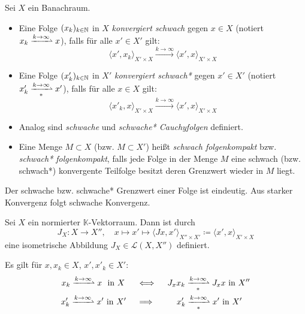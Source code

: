 \documentclass{cheat-sheet}
\newcommand{\K}{\mathbb{K}}
\newcommand{\LSO}{\mathcal{L}} %
\newcommand{\convWith}[1]{\xrightarrow{#1 \to \infty}} %
\newcommand{\convWeaklyWith}[1]{\xrightharpoonup{#1 \to \infty}} %
\newcommand{\convWeaklyStarWith}[1]{\xrightharpoonup[*]{#1 \to \infty}} %
\begin{document}
\begin{defn}
  Sei $X$ ein Banachraum.
  \begin{itemize}
    \item Eine Folge $(x_k)_{k \in \mathbb{N}}$ in $X$ \emph{konvergiert schwach} gegen $x \in X$ (notiert $x_k \convWeaklyWith{k} x$), falls für alle $x' \in X'$ gilt:
    \[ \langle x', x_k \rangle_{X' {\times} X} \convWith{k} \langle x', x \rangle_{X' {\times} X} \]
    \item Eine Folge $(x'_k)_{k \in \mathbb{N}}$ in $X'$ \emph{konvergiert schwach*} gegen $x' \in X'$ (notiert $x'_k \convWeaklyStarWith{k} x'$), falls für alle $x \in X$ gilt:
    \[ \langle x'_k, x \rangle_{X' {\times} X} \convWith{k} \langle x', x \rangle_{X' {\times} X} \]
    \item Analog sind \emph{schwache} und \emph{schwache* Cauchyfolgen} definiert.
    \item Eine Menge $M \subset X$ (bzw. $M \subset X'$) heißt \emph{schwach folgenkompakt} bzw. \emph{schwach* folgenkompakt}, falls jede Folge in der Menge $M$ eine schwach (bzw. schwach*) konvergente Teilfolge besitzt deren Grenzwert wieder in $M$ liegt.
  \end{itemize}
\end{defn}

\begin{bem}
  Der schwache bzw. schwache* Grenzwert einer Folge ist eindeutig. Aus starker Konvergenz folgt schwache Konvergenz.
\end{bem}

\begin{satz}
  Sei $X$ ein normierter $\K$-Vektorraum. Dann ist durch
  \[ J_X : X \to X'', \quad x \mapsto x' \mapsto \langle Jx , x' \rangle_{X'' {\times} X'} \coloneqq \langle x', x \rangle_{X' {\times} X} \]
  eine isometrische Abbildung $J_X \in \LSO(X, X'')$ definiert.
\end{satz}

\begin{satz}
  Es gilt für $x, x_k \in X$, $x', x'_k \in X'$:
  \begin{align*}
    x_k \convWeaklyWith{k} x \,\, \text{ in } X \, \quad &\iff \quad J_x x_k \convWeaklyStarWith{k} J_x x \text{ in } X'' \\
    x'_k \convWeaklyWith{k} x' \text{ in } X' \quad &\implies \qquad \,\, x'_k \convWeaklyStarWith{k} x' \text{ in } X'
  \end{align*}
\end{satz}
\end{document}
